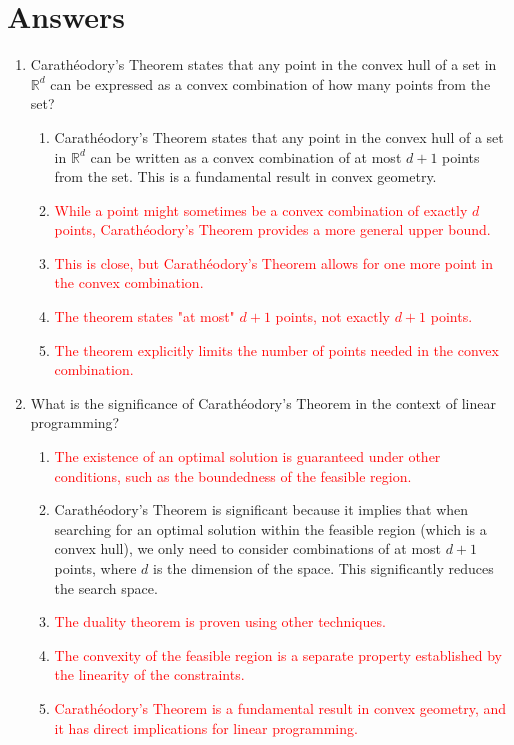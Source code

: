 \documentclass{article}%
\newcommand{\incorrect}[1]{\textcolor{red}{#1}}
\begin{document}
\section{Answers}%
\label{sec:Answers}%
\begin{enumerate}%
\item Carathéodory's Theorem states that any point in the convex hull of a set in $\mathbb{R}^d$ can be expressed as a convex combination of how many points from the set?%
\begin{enumerate}%
\item Carathéodory's Theorem states that any point in the convex hull of a set in $\mathbb{R}^d$ can be written as a convex combination of at most $d+1$ points from the set.  This is a fundamental result in convex geometry.%
\item \incorrect{While a point might sometimes be a convex combination of exactly $d$ points, Carathéodory's Theorem provides a more general upper bound.}%
\item \incorrect{This is close, but Carathéodory's Theorem allows for one more point in the convex combination.}%
\item \incorrect{The theorem states "at most" $d+1$ points, not exactly $d+1$ points.}%
\item \incorrect{The theorem explicitly limits the number of points needed in the convex combination.}%
\end{enumerate}%
\vspace{1em}%
\item What is the significance of Carathéodory's Theorem in the context of linear programming?%
\begin{enumerate}%
\item \incorrect{The existence of an optimal solution is guaranteed under other conditions, such as the boundedness of the feasible region.}%
\item Carathéodory's Theorem is significant because it implies that when searching for an optimal solution within the feasible region (which is a convex hull), we only need to consider combinations of at most $d+1$ points, where $d$ is the dimension of the space. This significantly reduces the search space.%
\item \incorrect{The duality theorem is proven using other techniques.}%
\item \incorrect{The convexity of the feasible region is a separate property established by the linearity of the constraints.}%
\item \incorrect{Carathéodory's Theorem is a fundamental result in convex geometry, and it has direct implications for linear programming.}%

\end{enumerate}
\end{enumerate}
\end{document}
